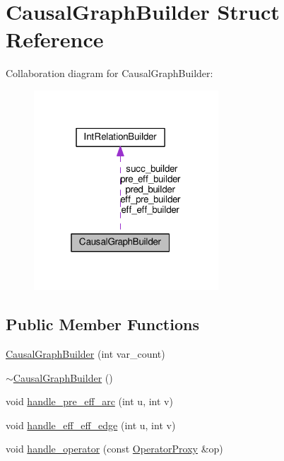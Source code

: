 \hypertarget{structCausalGraphBuilder}{\section{Causal\-Graph\-Builder Struct Reference}
\label{structCausalGraphBuilder}
}


Collaboration diagram for Causal\-Graph\-Builder\-:
\nopagebreak
\begin{figure}[H]
\begin{center}
\leavevmode
\includegraphics[width=196pt]{structCausalGraphBuilder__coll__graph}
\end{center}
\end{figure}
\subsection*{Public Member Functions}
\begin{DoxyCompactItemize}
\item 
\hyperlink{structCausalGraphBuilder_a220860e8bf4573f37608dc27ceae8a39}{Causal\-Graph\-Builder} (int var\-\_\-count)
\item 
\hyperlink{structCausalGraphBuilder_a2c87ca62dad3d471f4c9c16c122252ab}{$\sim$\-Causal\-Graph\-Builder} ()
\item 
void \hyperlink{structCausalGraphBuilder_a07d4a8c5185dd840b766f10b4927c858}{handle\-\_\-pre\-\_\-eff\-\_\-arc} (int u, int v)
\item 
void \hyperlink{structCausalGraphBuilder_a91630fdfada365f3e7274c3c70117ca9}{handle\-\_\-eff\-\_\-eff\-\_\-edge} (int u, int v)
\item 
void \hyperlink{structCausalGraphBuilder_adae0f168f463cd392b11b93430e5c7f9}{handle\-\_\-operator} (const \hyperlink{classOperatorProxy}{Operator\-Proxy} \&op)
\end{DoxyCompactItemize}
